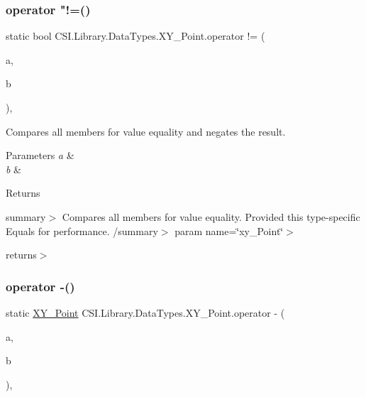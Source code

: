 \subsubsection{\texorpdfstring{operator "!=()}{operator !=()}}
{\footnotesize\ttfamily static bool C\+S\+I.\+Library.\+Data\+Types.\+X\+Y\+\_\+\+Point.\+operator != (\begin{DoxyParamCaption}\item[{\mbox{\hyperlink{struct_c_s_i_1_1_library_1_1_data_types_1_1_x_y___point}{X\+Y\+\_\+\+Point}}}]{a,  }\item[{\mbox{\hyperlink{struct_c_s_i_1_1_library_1_1_data_types_1_1_x_y___point}{X\+Y\+\_\+\+Point}}}]{b }\end{DoxyParamCaption})\hspace{0.3cm}{\ttfamily [inline]}, {\ttfamily [static]}}



Compares all members for value equality and negates the result. 


\begin{DoxyParams}{Parameters}
{\em a} & \\
\hline
{\em b} & \\
\hline
\end{DoxyParams}
\begin{DoxyReturn}{Returns}

\end{DoxyReturn}
summary$>$ Compares all members for value equality. Provided this type-\/specific Equals for performance. /summary$>$ param name=\char`\"{}xy\+\_\+\+Point\char`\"{}$>$

returns$>$\mbox{\label{struct_c_s_i_1_1_library_1_1_data_types_1_1_x_y___point_abc78d9c8ed6eab0d191d51613010aa13}} 
\subsubsection{\texorpdfstring{operator -\/()}{operator -()}}
{\footnotesize\ttfamily static \mbox{\hyperlink{struct_c_s_i_1_1_library_1_1_data_types_1_1_x_y___point}{X\+Y\+\_\+\+Point}} C\+S\+I.\+Library.\+Data\+Types.\+X\+Y\+\_\+\+Point.\+operator -\/ (\begin{DoxyParamCaption}\item[{\mbox{\hyperlink{struct_c_s_i_1_1_library_1_1_data_types_1_1_x_y___point}{X\+Y\+\_\+\+Point}}}]{a,  }\item[{\mbox{\hyperlink{struct_c_s_i_1_1_library_1_1_data_types_1_1_x_y___point}{X\+Y\+\_\+\+Point}}}]{b }\end{DoxyParamCaption})\hspace{0.3cm}{\ttfamily [inline]}, {\ttfamily [static]}}




